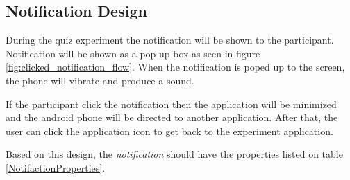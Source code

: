 \subsection{Notification Design}

During the quiz experiment the notification will be shown to the participant.
Notification will be shown as a pop-up box as seen in figure \ref{fig:clicked_notification_flow}.
When the notification is poped up to the screen, the phone will vibrate and produce a sound.

 If the participant click the notification then the application will be minimized and the android phone will be directed to another application.
 After that, the user can click the application icon to get back to the experiment application.

Based on this design, the \textit{notification} should have the properties listed on table \ref{NotifactionProperties}.

